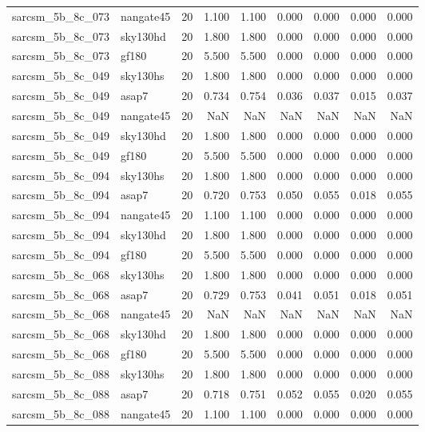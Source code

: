 \begin{tabular}{llrrrrrrr}
sarcsm\_5b\_8c\_073 & nangate45 & 20 & 1.100 & 1.100 & 0.000 & 0.000 & 0.000 & 0.000 \\
sarcsm\_5b\_8c\_073 & sky130hd & 20 & 1.800 & 1.800 & 0.000 & 0.000 & 0.000 & 0.000 \\
sarcsm\_5b\_8c\_073 & gf180 & 20 & 5.500 & 5.500 & 0.000 & 0.000 & 0.000 & 0.000 \\
sarcsm\_5b\_8c\_049 & sky130hs & 20 & 1.800 & 1.800 & 0.000 & 0.000 & 0.000 & 0.000 \\
sarcsm\_5b\_8c\_049 & asap7 & 20 & 0.734 & 0.754 & 0.036 & 0.037 & 0.015 & 0.037 \\
sarcsm\_5b\_8c\_049 & nangate45 & 20 & NaN & NaN & NaN & NaN & NaN & NaN \\
sarcsm\_5b\_8c\_049 & sky130hd & 20 & 1.800 & 1.800 & 0.000 & 0.000 & 0.000 & 0.000 \\
sarcsm\_5b\_8c\_049 & gf180 & 20 & 5.500 & 5.500 & 0.000 & 0.000 & 0.000 & 0.000 \\
sarcsm\_5b\_8c\_094 & sky130hs & 20 & 1.800 & 1.800 & 0.000 & 0.000 & 0.000 & 0.000 \\
sarcsm\_5b\_8c\_094 & asap7 & 20 & 0.720 & 0.753 & 0.050 & 0.055 & 0.018 & 0.055 \\
sarcsm\_5b\_8c\_094 & nangate45 & 20 & 1.100 & 1.100 & 0.000 & 0.000 & 0.000 & 0.000 \\
sarcsm\_5b\_8c\_094 & sky130hd & 20 & 1.800 & 1.800 & 0.000 & 0.000 & 0.000 & 0.000 \\
sarcsm\_5b\_8c\_094 & gf180 & 20 & 5.500 & 5.500 & 0.000 & 0.000 & 0.000 & 0.000 \\
sarcsm\_5b\_8c\_068 & sky130hs & 20 & 1.800 & 1.800 & 0.000 & 0.000 & 0.000 & 0.000 \\
sarcsm\_5b\_8c\_068 & asap7 & 20 & 0.729 & 0.753 & 0.041 & 0.051 & 0.018 & 0.051 \\
sarcsm\_5b\_8c\_068 & nangate45 & 20 & NaN & NaN & NaN & NaN & NaN & NaN \\
sarcsm\_5b\_8c\_068 & sky130hd & 20 & 1.800 & 1.800 & 0.000 & 0.000 & 0.000 & 0.000 \\
sarcsm\_5b\_8c\_068 & gf180 & 20 & 5.500 & 5.500 & 0.000 & 0.000 & 0.000 & 0.000 \\
sarcsm\_5b\_8c\_088 & sky130hs & 20 & 1.800 & 1.800 & 0.000 & 0.000 & 0.000 & 0.000 \\
sarcsm\_5b\_8c\_088 & asap7 & 20 & 0.718 & 0.751 & 0.052 & 0.055 & 0.020 & 0.055 \\
sarcsm\_5b\_8c\_088 & nangate45 & 20 & 1.100 & 1.100 & 0.000 & 0.000 & 0.000 & 0.000 \\

\end{tabular}
